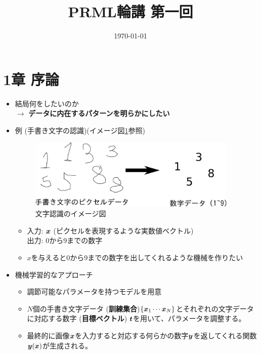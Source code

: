 \documentclass[a4j,11pt]{jarticle}
\title{PRML輪講 第一回}
\author{}
\date{\today}
\makeatletter
\def\thefootnote{\ifnum\c@footnote>\z@\leavevmode\lower.5ex%
      \hbox{$^{\@arabic\c@footnote)}$}\fi}
\def\v#1{\mbox{\boldmath $#1$}}
\makeatother
\begin{document}
%

\maketitle

\section*{1章 序論}
\begin{itemize}
	\item 結局何をしたいのか\\
		$\rightarrow$ \textbf{データに内在するパターンを明らかにしたい}
	\item 例 (手書き文字の認識)(イメージ図\ref{fig:learning1}参照)\\
		\begin{figure}[htbp]
			\centering
			\includegraphics[width=10cm]{learning1.pdf}
			\caption{文字認識のイメージ図}
			\label{fig:learning1}
		\end{figure}
		\begin{itemize}
			\item 入力: $\v{x}$ (ピクセルを表現するような実数値ベクトル)\\
				出力: 0から9までの数字
			\item \v{x}を与えると0から9までの数字を出してくれるような機械を作りたい
		\end{itemize}
	\item 機械学習的なアプローチ
		\begin{itemize}
			\item 調節可能なパラメータを持つモデルを用意
			\item $N$個の手書き文字データ (\textbf{訓練集合})$\{\v{x}_1 \cdots \v{x}_N\}$とそれぞれの文字データに対応する数字 (\textbf{目標ベクトル}) $\v{t}$を用いて、パラメータを調整する。
			\item 最終的に画像$\v{x}$を入力すると対応する何らかの数字$\v{y}$を返してくれる関数$\v{y}(\v{x})$が生成される。

\end{itemize}
\end{itemize}
\end{document}
